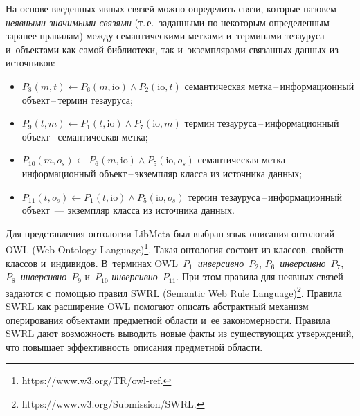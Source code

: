 \begin{multicols}{2}
На основе введенных явных связей можно определить связи, которые 
назовем \textit{неявными значимыми связями} (т.\,е.\ заданными по 
некоторым определенным заранее правилам) между семантическими 
метками и~терминами тезауруса и~объектами как самой биб\-лио\-те\-ки, так 
и~экземплярами связанных данных из источников: 
\begin{itemize}
\item $P_8(m, t) \leftarrow P_6(m, \mathrm{io}) \wedge P_2(\mathrm{io}, t)$ семантическая 
мет\-ка\,--\,ин\-фор\-ма\-ци\-он\-ный объект\,--\,тер\-мин тезауруса;
\item $P_9(t, m) \leftarrow P_1(t, \mathrm{io}) \wedge P_7(\mathrm{io}, m)$ термин  
те\-за\-у\-ру\-са\,--\,ин\-фор\-ма\-ци\-он\-ный  
объ\-ект\,--\,се\-ман\-ти\-че\-ская метка;
\item $P_{10}(m, o_s) \leftarrow P_6(m, \mathrm{io}) \wedge P_5(\mathrm{io}, o_s)$ семантическая  
мет\-ка\,--\,ин\-фор\-ма\-ци\-он\-ный объект\,--\,эк\-земп\-ляр класса из 
источника данных;
\item $P_{11}(t, o_s) \leftarrow P_1(t, \mathrm{io}) \wedge P_5(\mathrm{io}, o_s)$ термин  
те\-за\-у\-ру\-са\,--\,ин\-фор\-ма\-ци\-он\-ный объект~--- экземпляр класса из 
источника данных.
\end{itemize}

     Для представления онтологии LibMeta был выбран язык описания 
онтологий OWL (Web Ontology Language)\footnote{{\sf https://www.w3.org/TR/owl-ref}.}. Такая онтология 
со\-сто\-ит из классов, свойств классов и~индивидов. В~терминах 
OWL~$P_1$~\textit{инверсивно}~$P_2$, $P_6$~\textit{инверсивно}~$P_7$, 
$P_8$~\textit{инверсивно}~$P_9$ и~$P_{10}$ \textit{инверсивно}~$P_{11}$. При этом 
правила для неявных связей задаются с~по\-мощью правил SWRL
(Semantic Web Rule Language)\footnote{ {\sf 
https://www.w3.org/Submission/SWRL}.}. Правила SWRL как расширение 
OWL помогают описать 
абстрактный механизм оперирования объектами предметной области и~ее 
закономерности. Правила SWRL дают возможность выводить новые факты из 
существующих утверж\-де\-ний, что повышает эффективность описания 
предметной об\-ласти.
     

\end{multicols}
